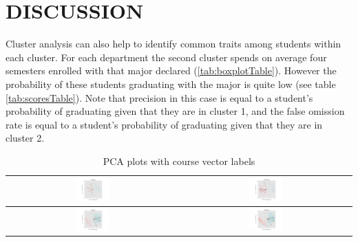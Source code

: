 \documentclass{sigchi}
\begin{document}
\section{DISCUSSION}

Cluster analysis can also help to identify common traits among students within each cluster. For each department the second cluster spends on average four semesters enrolled with that major declared (\ref{tab:boxplotTable}). However the probability of these students graduating with the major is quite low (see table \ref{tab:scoresTable}).
Note that precision in this case is equal to a student’s probability of graduating given that they are in cluster 1, and the false omission rate is equal to a student’s probability of graduating given that they are in cluster 2.

\begin{table}[h!]
 \begin{center}
   \begin{tabular}{| c | c |}

   \hline
   \includegraphics[width=0.2\textwidth]{figures/EconomicsPCA.png}
   &
   \includegraphics[width=0.2\textwidth]{figures/BusinessLawPCA.png}
   \\
   \hline
   \includegraphics[width=0.2\textwidth]{figures/MarketingPCA.png}
	&   
   \includegraphics[width=0.2\textwidth]{figures/ManagementPCA.png}
   \\
   \hline
   \end{tabular}
 \end{center}
 \caption{PCA plots with course vector labels}~\label{tab:pcaTable}
\end{table}
\end{document}
